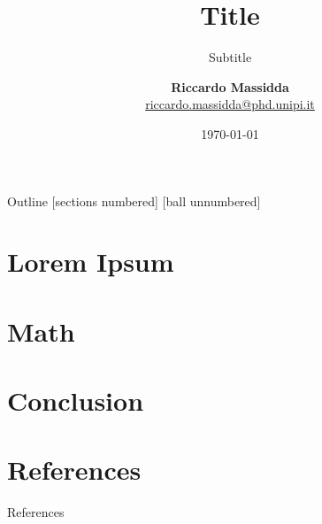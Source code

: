 \documentclass[8pt, xcolor=svgnames, compress]{beamer}
\title{Title}
\subtitle{Subtitle}
\author[Name]{
  {\large \textbf{Riccardo Massidda}}\\
  \href{mailto:riccardo.massidda@phd.unipi.it}{\textcolor{main}{riccardo.massidda@phd.unipi.it}}\\
}
\institute[uni]{\large Department of Computer Science\\University of Pisa}
\date{\today}
\begin{document}
\maketitle

\begin{frame}{Outline}
  [sections numbered] 
  [ball unnumbered]
  \tableofcontents[hideallsubsections]
\end{frame}

\section{Lorem Ipsum}



\section{Math}



\section*{Conclusion}



\section*{References}

\begin{frame}[plain]{References}
    \printbibliography[heading=none]
\end{frame}
\end{document}
